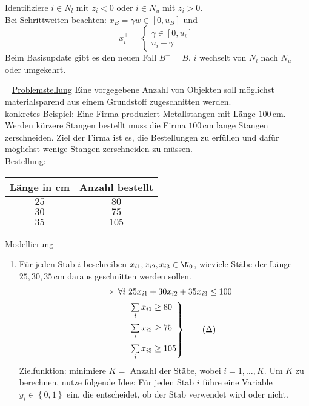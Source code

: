 Identifiziere $i \in N_{l}$ mit $z_{i} <0 $ oder $ i\in N_{u}$ mit $z_{i}> 0$.\\
Bei Schrittweiten beachten: $x_{B} = \gamma w \in [0,u_{B}]$ und
\begin{equation*}
	x_{i}^+ = \begin{cases}
	 \gamma \in [0,u_{i}]\\
	 u_{i}-\gamma
\end{cases}
\end{equation*}
Beim Basisupdate gibt es den neuen Fall $B^+ = B$, $i$ wechselt von $N_{l}$ nach $N_{u}$ oder umgekehrt.
\begin{beispiel}[Zuschnittsoptimierung]~\nl
  	\underline{Problemstellung} Eine vorgegebene Anzahl von Objekten soll möglichst materialsparend aus einem Grundstoff zugeschnitten werden.\\
  	\underline{konkretes Beispiel}: Eine Firma produziert Metallstangen mit Länge $100\,$cm. Werden kürzere Stangen bestellt muss die Firma $100\,$cm lange Stangen zerschneiden. Ziel der Firma ist es, die Bestellungen zu erfüllen und dafür möglichst wenige Stangen zerschneiden zu müssen.\\
  	Bestellung:
	\begin{table}[H]
		\centering
		\begin{tabular}{c|c}
			Länge in cm & Anzahl bestellt\\
      		\hline
      		$25$ & $80$ \\
      		$30$ & $75$ \\
      		$35$ & $105$ \\
  		\end{tabular}
	\end{table}
	\underline{Modellierung}
  \begin{enumerate}[label={Variante \arabic*.}]
    \item \label{item:Zuschnittsillymodel} Für jeden Stab $i$ beschreiben $x_{i1},x_{i2},x_{i3} \in \N_{0}$, wieviele Stäbe der Länge $25,30,35\,$cm daraus geschnitten werden sollen.
      \begin{align}
        \implies \forall i~ & 25x_{i1} + 30x_{i2} + 35x_{i3}\leq 100 \notag\\
                            &
        \begin{rcases}
          \sum\limits_{i}^{} x_{i1} \geq 80\\
          \sum\limits_{i}^{} x_{i2} \geq 75\\
          \sum\limits_{i}^{} x_{i3} \geq 105
        \end{rcases} \tag{$\Delta$}\label{model_cutting_1}
      \end{align}
      Zielfunktion: minimiere $K = \text{ Anzahl der Stäbe}$, wobei $i = 1,\dots ,K$.
      Um $K$ zu berechnen, nutze folgende Idee: Für jeden Stab $i$ führe eine Variable $y_{i} \in \left\{0,1 \right\}$ ein, die entscheidet, ob der Stab verwendet wird oder nicht.


\end{enumerate}
\end{beispiel}
